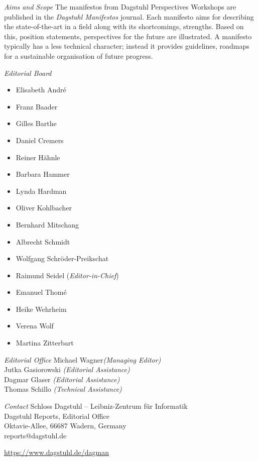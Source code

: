 \documentclass[a4paper,USenglish]{dagman-master-v2021}
\begin{document}
\begin{publicationinfo}
\newpage


\bigskip
\bigskip


\emph{Aims and Scope}\newline
The manifestos from Dagstuhl Perspectives Workshops are published in the \emph{Dagstuhl Manifestos} journal. Each manifesto aims for describing the state-of-the-art in a field along with its shortcomings, strengths. Based on this, position statements, perspectives for the future are illustrated. A manifesto typically has a less technical character; instead it provides guidelines, roadmaps for a sustainable organisation of future progress. 

\bigskip
\bigskip

\emph{Editorial Board}
\begin{itemize}
\item Elisabeth Andr\'{e}
\item Franz Baader
\item Gilles Barthe
\item Daniel Cremers
\item Reiner H\"ahnle
\item Barbara Hammer
\item Lynda Hardman
\item Oliver Kohlbacher
\item Bernhard Mitschang
\item Albrecht Schmidt
\item Wolfgang Schr\"{o}der-Preikschat
\item Raimund Seidel (\emph{Editor-in-Chief})
\item Emanuel Thom\'{e}
\item Heike Wehrheim
\item Verena Wolf
\item Martina Zitterbart
\end{itemize}

\medskip
\emph{Editorial Office}\newline
Michael Wagner\emph{(Managing Editor)}\\
Jutka Gasiorowski \emph{(Editorial Assistance)}\\
Dagmar Glaser \emph{(Editorial Assistance)}\\
Thomas Schillo \emph{(Technical Assistance)}

\medskip
\emph{Contact}\newline
Schloss Dagstuhl -- Leibniz-Zentrum f\"ur Informatik\\
Dagstuhl Reports, Editorial Office\\
Oktavie-Allee, 66687 Wadern, Germany\\ 
reports@dagstuhl.de


\vfill

\href{https://www.dagstuhl.de/dagman}{https://www.dagstuhl.de/dagman}

  
\end{publicationinfo}
\end{document}
